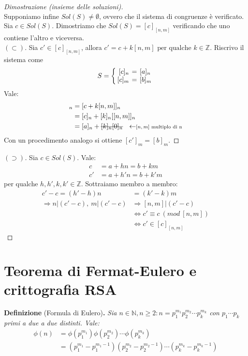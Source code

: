 \documentclass[12pt,twoscolu]{article}
\newcommand{\N}{\mathbb{N}}
\newcommand{\Z}{\mathbb{Z}}
\newcommand{\sesolose}{\Leftrightarrow}
\newcommand{\implica}{\Longrightarrow}
\newcommand{\pq}{\text{ per qualche }}
\renewcommand\qedsymbol{$\blacksquare$}
\newcommand{\stkout}[1]{\ifmmode\text{\sout{\ensuremath{#1}}}\else\sout{#1}\fi}
\begin{document}
\begin{proof}[Dimostrazione (insieme delle soluzioni)]\ \\
Supponiamo infine $Sol(S) \ne \emptyset$, ovvero che il sistema di congruenze è verificato. Sia $c \in Sol(S)$. Dimostriamo che $Sol(S) = [c]_{[n,m]}$ verificando che uno contiene l'altro e viceversa.
\\[1\baselineskip]$(\subset)$.
Sia $ c' \in [c]_{[n,m]}$, allora $c' = c + k[n,m] \pq k \in \Z$. Riscrivo il sistema come
\[
S = \left\{
\setlength\arraycolsep{2pt}
\begin{array}{rcl} [c]_n & = & [a]_n \\ \relax
 [c]_m & = & [b]_m
\end{array}\right
.
\]
Vale:
\begin{align*}
[c']_n &= [c + k[n,m]]_n \\ 
&= [c]_n + [k]_n [[n,m]]_n \\
&= [a]_n + \stkout{[k]_n [0]_n} \ \ \leftarrow\scriptstyle{ \text{$[n,m]$ multiplo di n}}
\end{align*}
Con un procedimento analogo si ottiene $[c']_m = [b]_m$.
\end{proof}
\renewcommand\qedsymbol{$\blacksquare$}
\begin{proof}[$(\supset)$]
Sia $c \in Sol(S)$. Vale:
\begin{align*}
c &= a+hn = b + km \\
c' &= a+h'n = b + k'm
\end{align*}
per qualche $h, h', k, k' \in \Z$. Sottraiamo membro a membro:
\begin{align*}
c' - c = (h' - h)n &= (k' - k)m \\
\implica n | (c' -c),\ m|(c' - c) &\implica [n, m]|(c' - c) \\
&\sesolose c' \equiv c \ (mod \ [n, m]) \\
&\sesolose c' \in [c]_{[n,m]}
\end{align*}
\end{proof}

\section{Teorema di Fermat-Eulero e crittografia RSA}
\textbf{Definizione} (Formula di Eulero)\textbf{.} \textit{Sia $n \in \N, n \ge 2: n = p^{m_1}_1 p^{m_2}_2 \cdots p^{m_k}_k$ con $p_1 \cdots p_k$ primi a due a due distinti. Vale:
\begin{align*}
\phi(n) &= \phi(p^{m_1}_1)\phi(p^{m_2}_2) \cdots \phi(p^{m_k}_k) \\
&= (p^{m_1}_1 - p^{m_1 - 1}_1) (p^{m_2}_2 - p^{m_2 - 1}_2) \cdots (p^{m_k}_k - p^{m_k - 1}_k)
\end{align*}
}
\end{document}
